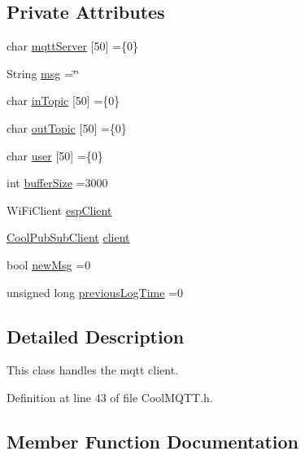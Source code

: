 \subsection*{Private Attributes}
\begin{DoxyCompactItemize}
\item 
char \hyperlink{class_cool_m_q_t_t_ab8bb951f87ddbf92db74c2ad16a3e53e}{mqtt\+Server} \mbox{[}50\mbox{]} =\{\textquotesingle{}0\textquotesingle{}\}
\item 
String \hyperlink{class_cool_m_q_t_t_af6b19e7074dbbb4ae493c44dcb53f7ff}{msg} =\char`\"{}\char`\"{}
\item 
char \hyperlink{class_cool_m_q_t_t_a4492f52a441e83cc5151010317fdb52d}{in\+Topic} \mbox{[}50\mbox{]} =\{\textquotesingle{}0\textquotesingle{}\}
\item 
char \hyperlink{class_cool_m_q_t_t_a109c786a17b463f9eeba046194279522}{out\+Topic} \mbox{[}50\mbox{]} =\{\textquotesingle{}0\textquotesingle{}\}
\item 
char \hyperlink{class_cool_m_q_t_t_a8cd47e45d457f908d4b4390b35aaee83}{user} \mbox{[}50\mbox{]} =\{\textquotesingle{}0\textquotesingle{}\}
\item 
int \hyperlink{class_cool_m_q_t_t_a7f3cf26b51d6770f216e42c5ef13ca9f}{buffer\+Size} =3000
\item 
Wi\+Fi\+Client \hyperlink{class_cool_m_q_t_t_acc30a0200967374a524092a8a806502a}{esp\+Client}
\item 
\hyperlink{class_cool_pub_sub_client}{Cool\+Pub\+Sub\+Client} \hyperlink{class_cool_m_q_t_t_afed1372683c44893b4668d0f1771f514}{client}
\item 
bool \hyperlink{class_cool_m_q_t_t_a3240388137b885775aadf38e96b24c6b}{new\+Msg} =0
\item 
unsigned long \hyperlink{class_cool_m_q_t_t_a3db37ef9ed3b05b2a8d44edba0e7d3cc}{previous\+Log\+Time} =0
\end{DoxyCompactItemize}


\subsection{Detailed Description}
This class handles the mqtt client. 

Definition at line 43 of file Cool\+M\+Q\+T\+T.\+h.



\subsection{Member Function Documentation}
\mbox{\label{class_cool_m_q_t_t_ac9248808641ebf3054ed0620ea9d0100}} 
